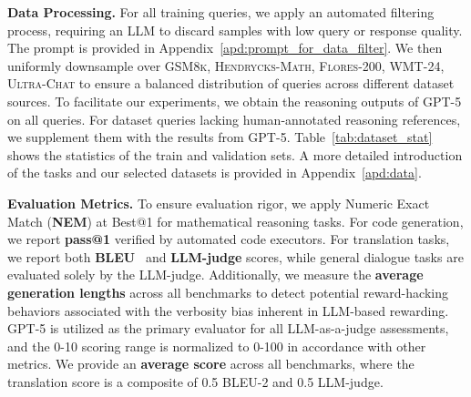 \noindent\textbf{Data Processing.} For all training queries, we apply an automated filtering process, requiring an LLM to discard samples with low query or response quality. The prompt is provided in Appendix~\ref{apd:prompt_for_data_filter}. We then uniformly downsample over \textsc{GSM8k, Hendrycks-Math, Flores-200, WMT-24, Ultra-Chat} to ensure a balanced distribution of queries across different dataset sources. To facilitate our experiments, we obtain the reasoning outputs of \textsc{GPT-5} on all queries. For dataset queries lacking human-annotated reasoning references, we supplement them with the results from \textsc{GPT-5}. Table~\ref{tab:dataset_stat} shows the statistics of the train and validation sets. A more detailed introduction of the tasks and our selected datasets is provided in Appendix~\ref{apd:data}.



\noindent\textbf{Evaluation Metrics.} To ensure evaluation rigor, we apply Numeric Exact Match (\textbf{NEM}) at Best@1 for mathematical reasoning tasks. For code generation, we report \textbf{pass@1} verified by automated code executors.
For translation tasks, we report both \textbf{BLEU}~\citep{papineni-etal-2002-bleu} and \textbf{LLM-judge} scores, while general dialogue tasks are evaluated solely by the LLM-judge. Additionally, we measure the \textbf{average generation lengths} across all benchmarks to detect potential reward-hacking behaviors associated with the verbosity bias inherent in LLM-based rewarding. GPT-5 is utilized as the primary evaluator for all LLM-as-a-judge assessments, and the 0-10 scoring range is normalized to 0-100 in accordance with other metrics.
We provide an \textbf{average score} across all benchmarks, where the translation score is a composite of 0.5 BLEU-2 and 0.5 LLM-judge.



